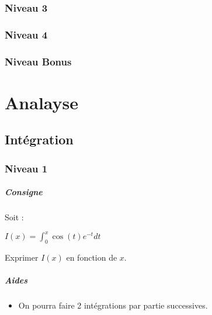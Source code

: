 \documentclass[a4paper]{report}
\newcounter{exnumber}
\begin{document}
			\subsection{Niveau 3}
			
			\subsection{Niveau 4}
			
			\subsection{Niveau Bonus}
	
	\chapter{Analayse}
		\section{Intégration}
			\subsection{Niveau 1}
				\begin{tcolorbox}[colback=white,colframe=black,title=Exercice n°\arabic{exnumber} - Intégration\underline{s} par partie]
					\paragraph{Consigne}
						Soit :
						\begin{center}
							$I(x) = \int_{0}^{x} \cos (t) e^{-t} dt$
						\end{center}
						Exprimer $I(x)$ en fonction de $x$.
						
					\tcblower					
					
					\paragraph{Aides}
						\begin{itemize}
							\item On pourra faire 2 intégrations par partie successives.					
						\end{itemize}	
				\end{tcolorbox}	
				\addtocounter{exnumber}{1}
		
\end{document}

